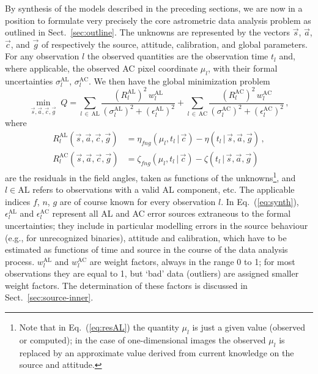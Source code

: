 \documentclass[structabstract]{aa}
\begin{document}
By synthesis of the models described in the preceding sections,
we are now in a position to formulate very precisely the core
astrometric data analysis problem as outlined in
Sect.~\ref{sec:outline}. The unknowns are represented by the
vectors $\vec{s}$, $\vec{a}$, $\vec{c}$, and $\vec{g}$ of
respectively the source, attitude, calibration, and global
parameters. For any observation $l$ the observed quantities are the
observation time $t_l$ and, where applicable, the observed AC pixel
coordinate $\mu_l$, with their formal uncertainties $\sigma_l^\text{AL}$,
$\sigma_l^\text{AC}$. We then have the global minimization problem
\begin{equation}\label{eq:synth}
\min_{\vec{s},\vec{a},\vec{c},\vec{g}}\;
Q = \sum_{l\,\in\,\text{AL}} \frac{(R_l^\text{AL})^2\,w_l^\text{AL}}%
{(\sigma_l^\text{AL})^2+(\epsilon_l^\text{AL})^2}
+ \sum_{l\,\in\,\text{AC}} \frac{(R_l^\text{AC})^2\,w_l^\text{AC}}%
{(\sigma_l^\text{AC})^2+(\epsilon_l^\text{AC})^2}\, ,
\end{equation}
where
\begin{align}
R_l^\text{AL}(\vec{s},\vec{a},\vec{c},\vec{g}) &= \eta_{fng}(\mu_l,t_l\,|\,\vec{c})-
\eta(t_l\,|\,\vec{s},\vec{a},\vec{g})\label{eq:resAL}\, ,\\[3pt]
R_l^\text{AC}(\vec{s},\vec{a},\vec{c},\vec{g}) &= \zeta_{fng}(\mu_l,t_l\,|\,\vec{c})-
\zeta(t_l\,|\,\vec{s},\vec{a},\vec{g})\label{eq:resAC}
\end{align}
are the residuals in the field angles, taken as functions of the 
unknowns\footnote{Note that in Eq.~(\ref{eq:resAL}) the quantity $\mu_l$ is just a 
given value (observed or computed); in the case of one-dimensional images 
the observed $\mu_l$ is replaced by an approximate value derived from 
current knowledge on the source and attitude.},
and $l\in\text{AL}$ refers to observations with a valid AL component, etc.
The applicable indices $f$, $n$, $g$ are of course known for every
observation $l$. In Eq.~(\ref{eq:synth}), $\epsilon_l^\text{AL}$ and
$\epsilon_l^\text{AC}$ represent all AL and AC error sources extraneous
to the formal uncertainties; they include in particular modelling errors in the
source behaviour (e.g., for unrecognized binaries), attitude and calibration, 
which have to be estimated as functions
of time and source in the course of the data analysis process.
$w_l^\text{AL}$ and $w_l^\text{AC}$ are weight factors, always in the range 0 to 1;
for most observations they are equal to 1, but `bad' data (outliers) are assigned
smaller weight factors. The determination of these factors is discussed in
Sect.~\ref{sec:source-inner}.
\end{document}
